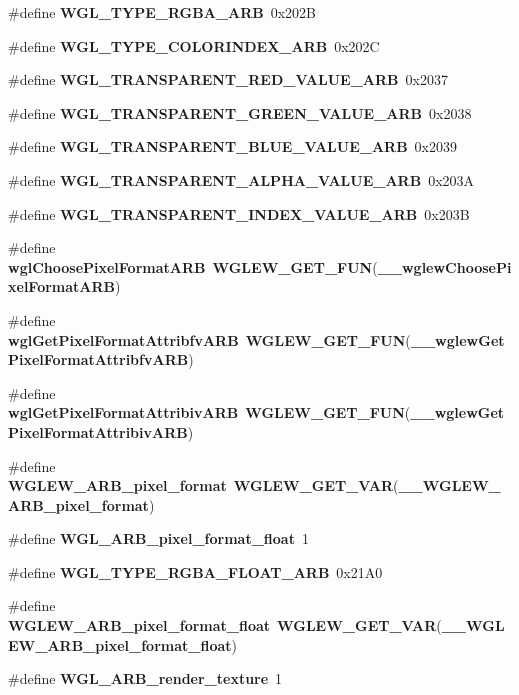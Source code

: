 \begin{DoxyCompactItemize}
\item 
\#define {\bf W\+G\+L\+\_\+\+T\+Y\+P\+E\+\_\+\+R\+G\+B\+A\+\_\+\+A\+RB}~0x202B
\item 
\#define {\bf W\+G\+L\+\_\+\+T\+Y\+P\+E\+\_\+\+C\+O\+L\+O\+R\+I\+N\+D\+E\+X\+\_\+\+A\+RB}~0x202C
\item 
\#define {\bf W\+G\+L\+\_\+\+T\+R\+A\+N\+S\+P\+A\+R\+E\+N\+T\+\_\+\+R\+E\+D\+\_\+\+V\+A\+L\+U\+E\+\_\+\+A\+RB}~0x2037
\item 
\#define {\bf W\+G\+L\+\_\+\+T\+R\+A\+N\+S\+P\+A\+R\+E\+N\+T\+\_\+\+G\+R\+E\+E\+N\+\_\+\+V\+A\+L\+U\+E\+\_\+\+A\+RB}~0x2038
\item 
\#define {\bf W\+G\+L\+\_\+\+T\+R\+A\+N\+S\+P\+A\+R\+E\+N\+T\+\_\+\+B\+L\+U\+E\+\_\+\+V\+A\+L\+U\+E\+\_\+\+A\+RB}~0x2039
\item 
\#define {\bf W\+G\+L\+\_\+\+T\+R\+A\+N\+S\+P\+A\+R\+E\+N\+T\+\_\+\+A\+L\+P\+H\+A\+\_\+\+V\+A\+L\+U\+E\+\_\+\+A\+RB}~0x203A
\item 
\#define {\bf W\+G\+L\+\_\+\+T\+R\+A\+N\+S\+P\+A\+R\+E\+N\+T\+\_\+\+I\+N\+D\+E\+X\+\_\+\+V\+A\+L\+U\+E\+\_\+\+A\+RB}~0x203B
\item 
\#define {\bf wgl\+Choose\+Pixel\+Format\+A\+RB}~{\bf W\+G\+L\+E\+W\+\_\+\+G\+E\+T\+\_\+\+F\+UN}({\bf \+\_\+\+\_\+wglew\+Choose\+Pixel\+Format\+A\+RB})
\item 
\#define {\bf wgl\+Get\+Pixel\+Format\+Attribfv\+A\+RB}~{\bf W\+G\+L\+E\+W\+\_\+\+G\+E\+T\+\_\+\+F\+UN}({\bf \+\_\+\+\_\+wglew\+Get\+Pixel\+Format\+Attribfv\+A\+RB})
\item 
\#define {\bf wgl\+Get\+Pixel\+Format\+Attribiv\+A\+RB}~{\bf W\+G\+L\+E\+W\+\_\+\+G\+E\+T\+\_\+\+F\+UN}({\bf \+\_\+\+\_\+wglew\+Get\+Pixel\+Format\+Attribiv\+A\+RB})
\item 
\#define {\bf W\+G\+L\+E\+W\+\_\+\+A\+R\+B\+\_\+pixel\+\_\+format}~{\bf W\+G\+L\+E\+W\+\_\+\+G\+E\+T\+\_\+\+V\+AR}({\bf \+\_\+\+\_\+\+W\+G\+L\+E\+W\+\_\+\+A\+R\+B\+\_\+pixel\+\_\+format})
\item 
\#define {\bf W\+G\+L\+\_\+\+A\+R\+B\+\_\+pixel\+\_\+format\+\_\+float}~1
\item 
\#define {\bf W\+G\+L\+\_\+\+T\+Y\+P\+E\+\_\+\+R\+G\+B\+A\+\_\+\+F\+L\+O\+A\+T\+\_\+\+A\+RB}~0x21\+A0
\item 
\#define {\bf W\+G\+L\+E\+W\+\_\+\+A\+R\+B\+\_\+pixel\+\_\+format\+\_\+float}~{\bf W\+G\+L\+E\+W\+\_\+\+G\+E\+T\+\_\+\+V\+AR}({\bf \+\_\+\+\_\+\+W\+G\+L\+E\+W\+\_\+\+A\+R\+B\+\_\+pixel\+\_\+format\+\_\+float})
\item 
\#define {\bf W\+G\+L\+\_\+\+A\+R\+B\+\_\+render\+\_\+texture}~1

\end{DoxyCompactItemize}
